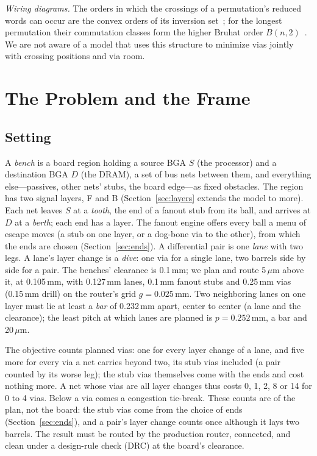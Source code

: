 \documentclass[journal]{IEEEtran}
\begin{document}
\emph{Wiring diagrams.} The orders in which the crossings of a permutation's reduced words can occur are the convex orders of its inversion set~\cite{papi1994}; for the longest permutation their commutation classes form the higher Bruhat order $B(n,2)$~\cite{manin1989}. We are not aware of a model that uses this structure to minimize vias jointly with crossing positions and via room.

\section{The Problem and the Frame}
\label{sec:problem}
\subsection{Setting}
A \emph{bench} is a board region holding a source BGA $S$ (the processor) and a destination BGA $D$ (the DRAM), a set of bus nets between them, and everything else---passives, other nets' stubs, the board edge---as fixed obstacles. The region has two signal layers, F and B (Section~\ref{sec:layers} extends the model to more). Each net leaves $S$ at a \emph{tooth}, the end of a fanout stub from its ball, and arrives at $D$ at a \emph{berth}; each end has a layer. The fanout engine offers every ball a menu of escape moves (a stub on one layer, or a dog-bone via to the other), from which the ends are chosen (Section~\ref{sec:ends}). A differential pair is one \emph{lane} with two legs. A lane's layer change is a \emph{dive}: one via for a single lane, two barrels side by side for a pair. The benches' clearance is 0.1\,mm; we plan and route 5\,$\mu$m above it, at 0.105\,mm, with 0.127\,mm lanes, 0.1\,mm fanout stubs and 0.25\,mm vias (0.15\,mm drill) on the router's grid $g=0.025$\,mm. Two neighboring lanes on one layer must lie at least a \emph{bar} of 0.232\,mm apart, center to center (a lane and the clearance); the least pitch at which lanes are planned is $p=0.252$\,mm, a bar and 20\,$\mu$m.

The objective counts planned vias: one for every layer change of a lane, and five more for every via a net carries beyond two, its stub vias included (a pair counted by its worse leg); the stub vias themselves come with the ends and cost nothing more. A net whose vias are all layer changes thus costs 0, 1, 2, 8 or 14 for 0 to 4 vias. Below a via comes a congestion tie-break. These counts are of the plan, not the board: the stub vias come from the choice of ends (Section~\ref{sec:ends}), and a pair's layer change counts once although it lays two barrels. The result must be routed by the production router, connected, and clean under a design-rule check (DRC) at the board's clearance.
\end{document}
